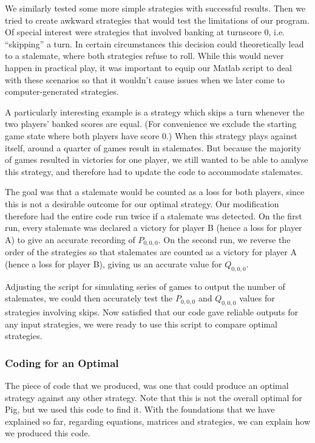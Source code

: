 \documentclass[a4paper,titlepage]{article}
\begin{document}
We similarly tested some more simple strategies with successful results. Then we tried to create awkward strategies that would test the limitations of our program. Of special interest were strategies that involved banking at turnscore 0, i.e. ``skipping'' a turn. In certain circumstances this decision could theoretically lead to a stalemate, where both strategies refuse to roll. While this would never happen in practical play, it was important to equip our Matlab script to deal with these scenarios so that it wouldn't cause issues when we later come to computer-generated strategies.

A particularly interesting example is a strategy which skips a turn whenever the two players' banked scores are equal. (For convenience we exclude the starting game state where both players have score 0.) When this strategy plays against itself, around a quarter of games result in stalemates. But because the majority of games resulted in victories for one player, we still wanted to be able to analyse this strategy, and therefore had to update the code to accommodate stalemates.

The goal was that a stalemate would be counted as a loss for both players, since this is not a desirable outcome for our optimal strategy. Our modification therefore had the entire code run twice if a stalemate was detected. On the first run, every stalemate was declared a victory for player B (hence a loss for player A) to give an accurate recording of $P_{0,0,0}$. On the second run, we reverse the order of the strategies so that stalemates are counted as a victory for player A (hence a loss for player B), giving us an accurate value for $Q_{0,0,0}$.

Adjusting the script for simulating series of games to output the number of stalemates, we could then accurately test the $P_{0,0,0}$ and $Q_{0,0,0}$ values for strategies involving skips. Now satisfied that our code gave reliable outputs for any input strategies, we were ready to use this script to compare optimal strategies.

\subsubsection{Coding for an Optimal}

The piece of code that we produced, was one that could produce an optimal strategy against any other strategy. Note that this is not the overall optimal for Pig, but we used this code to find it. With the foundations that we have explained so far, regarding equations, matrices and strategies, we can explain how we produced this code.
\end{document}
